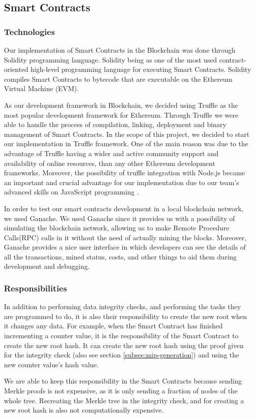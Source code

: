 \subsection{Smart Contracts}
\label{subsec:approach-smart-contracts}

\subsubsection*{Technologies}

Our implementation of Smart Contracts in the Blockchain was done through Solidity programming language. Solidity being as one of the most used contract-oriented high-level programming language for executing Smart Contracts. Solidity compiles Smart Contracts to bytecode that are executable on the Ethereum Virtual Machine (EVM). 

As our development framework in Blockchain, we decided using Truffle as the most popular development framework for Ethereum. Through Truffle we were able to handle the process of compilation, linking, deployment and binary management of Smart Contracts. In the scope of this project, we decided to start our implementation in Truffle framework. One of the main reason was due to the advantage of Truffle having a wider and active community support and availability of online resources, than any other Ethereum development frameworks. Moreover, the possibility of truffle integration with Node.js became an important and crucial advantage for our implementation due to our team’s advanced skills on JavaScript programming \cite{relatedWork29}.

In order to test our smart contracts development in a local blockchain network, we used Ganache. We used Ganache since it provides us with a possibility of simulating the blockchain network, allowing us to make Remote Procedure Calls(RPC) calls in it without the need of actually mining the blocks. Moreover, Ganache provides a nice user interface in which developers can see the details of all the transactions, mined status, costs, and other things to aid them during development and debugging. 

\subsubsection*{Responsibilities}

In addition to performing data integrity checks, and performing the tasks they are programmed to do, it is also their responsibility to create the new root when it changes any data. For example, when the Smart Contract has finished incrementing a counter value, it is the responsibility of the Smart Contract to create the new root hash. It can create the new root hash using the proof given for the integrity check (also see section \ref{subsec:mip-generation}) and using the new counter value’s hash value. 

We are able to keep this responsibility in the Smart Contracts because sending Merkle proofs is not expensive, as it is only sending a fraction of nodes of the whole tree. Recreating the Merkle tree in the integrity check, and for creating a new root hash is also not computationally expensive.
